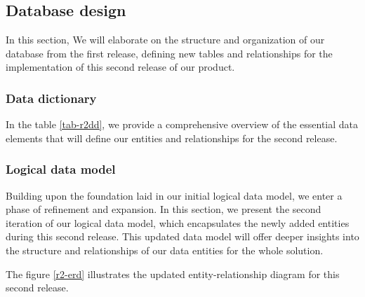 \subsection{Database design}
In this section, We will elaborate on the structure and organization of our database from the first release,
defining new tables and relationships for the implementation of this second release of our product.

\subsubsection{Data dictionary}
In the table \ref{tab-r2dd}, we provide a comprehensive overview of the essential data elements
that will define our entities and relationships for the second release.

\subsubsection{Logical data model}
Building upon the foundation laid in our initial logical data model, we enter a phase of refinement and
expansion. In this section, we present the second iteration of our logical data model, which encapsulates
the newly added entities during this second release. This updated data model will offer
deeper insights into the structure and relationships of our data entities for the whole solution.

\noindent The figure \ref{r2-erd} illustrates the updated entity-relationship diagram for this second release.

